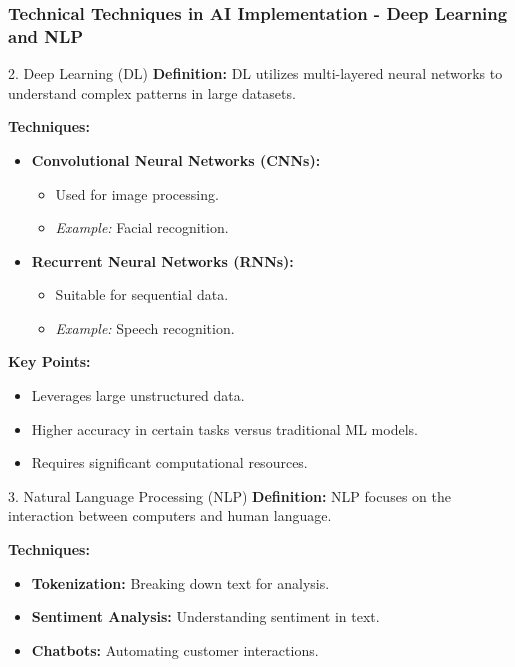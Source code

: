 \documentclass[aspectratio=169]{beamer}
\begin{document}
\begin{frame}[fragile]
    \frametitle{Technical Techniques in AI Implementation - Deep Learning and NLP}
    \begin{block}{2. Deep Learning (DL)}
        \textbf{Definition:}  
        DL utilizes multi-layered neural networks to understand complex patterns in large datasets.

        \textbf{Techniques:}
        \begin{itemize}
            \item \textbf{Convolutional Neural Networks (CNNs):} 
            \begin{itemize}
                \item Used for image processing.
                \item \textit{Example:} Facial recognition.
            \end{itemize}
            \item \textbf{Recurrent Neural Networks (RNNs):} 
            \begin{itemize}
                \item Suitable for sequential data.
                \item \textit{Example:} Speech recognition.
            \end{itemize}
        \end{itemize}

        \textbf{Key Points:}
        \begin{itemize}
            \item Leverages large unstructured data.
            \item Higher accuracy in certain tasks versus traditional ML models.
            \item Requires significant computational resources.
        \end{itemize}
    \end{block}

    \begin{block}{3. Natural Language Processing (NLP)}
        \textbf{Definition:}  
        NLP focuses on the interaction between computers and human language.

        \textbf{Techniques:}
        \begin{itemize}
            \item \textbf{Tokenization:} Breaking down text for analysis.
            \item \textbf{Sentiment Analysis:} Understanding sentiment in text.
            \item \textbf{Chatbots:} Automating customer interactions.
        \end{itemize}


\end{block}
\end{frame}
\end{document}

